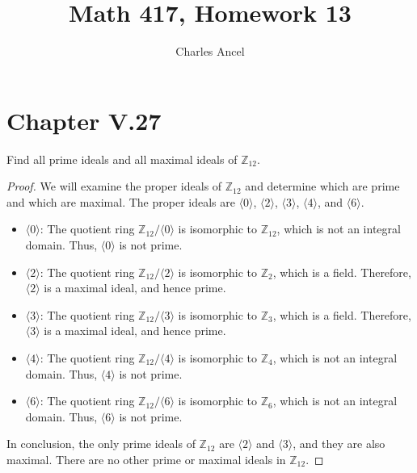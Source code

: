 \documentclass[12pt]{amsart}
\title{Math 417, Homework 13}
\author{Charles Ancel}
\theoremstyle{definition}
\numberwithin{equation}{section}
\theoremstyle{plain}
\newcommand{\Z}{\mathbb{Z}}
\begin{document}
\maketitle
\section*{Chapter V.27}
\begin{exercise}{2} Find all prime ideals and all maximal ideals of $\Z_12$.
    \begin{proof}
    We will examine the proper ideals of \(\mathbb{Z}_{12}\) and determine which are prime and which are maximal. The proper ideals are \(\langle 0 \rangle\), \(\langle 2 \rangle\), \(\langle 3 \rangle\), \(\langle 4 \rangle\), and \(\langle 6 \rangle\).
    
    \begin{itemize}
        \item \(\langle 0 \rangle\): The quotient ring \(\mathbb{Z}_{12}/\langle 0 \rangle\) is isomorphic to \(\mathbb{Z}_{12}\), which is not an integral domain. Thus, \(\langle 0 \rangle\) is not prime.
    
        \item \(\langle 2 \rangle\): The quotient ring \(\mathbb{Z}_{12}/\langle 2 \rangle\) is isomorphic to \(\mathbb{Z}_2\), which is a field. Therefore, \(\langle 2 \rangle\) is a maximal ideal, and hence prime.
    
        \item \(\langle 3 \rangle\): The quotient ring \(\mathbb{Z}_{12}/\langle 3 \rangle\) is isomorphic to \(\mathbb{Z}_3\), which is a field. Therefore, \(\langle 3 \rangle\) is a maximal ideal, and hence prime.
    
        \item \(\langle 4 \rangle\): The quotient ring \(\mathbb{Z}_{12}/\langle 4 \rangle\) is isomorphic to \(\mathbb{Z}_4\), which is not an integral domain. Thus, \(\langle 4 \rangle\) is not prime.
    
        \item \(\langle 6 \rangle\): The quotient ring \(\mathbb{Z}_{12}/\langle 6 \rangle\) is isomorphic to \(\mathbb{Z}_6\), which is not an integral domain. Thus, \(\langle 6 \rangle\) is not prime.
    \end{itemize}
    In conclusion, the only prime ideals of \(\mathbb{Z}_{12}\) are \(\langle 2 \rangle\) and \(\langle 3 \rangle\), and they are also maximal. There are no other prime or maximal ideals in \(\mathbb{Z}_{12}\).
    \end{proof}
\end{exercise}
\end{document}
